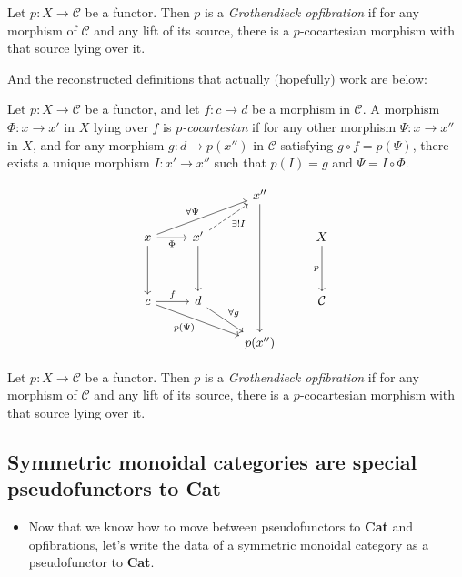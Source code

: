 \documentclass{MetricNotes2023}
\begin{document}
\begin{definition}
Let \(p : X \to \mathcal{C}\) be a functor. Then \(p\) is a \textit{Grothendieck opfibration} if for any morphism of \(\mathcal{C}\) and any lift of its source, there is a \(p\)-cocartesian morphism with that source lying over it.
\end{definition}

And the reconstructed definitions that actually (hopefully) work are below:

\begin{definition}
Let \(p : X \to \mathcal{C}\) be a functor, and let \(f : c \to d\) be a morphism in \(\mathcal{C}\). A morphism \(\Phi : x \to x'\) in \(X\) lying over \(f\) is \textit{\(p\)-cocartesian} if for any other morphism \(\Psi : x \to x''\) in \(X\), and for any morphism \(g : d \to p(x'')\) in \(\mathcal{C}\) satisfying \(g \circ f = p(\Psi)\), there exists a unique morphism \(I : x' \to x''\) such that \(p(I)=g\) and \(\Psi = I \circ \Phi\).  
\end{definition}

\[\begin{tikzcd}
 & & x'' \arrow[dddd, ""] & \\
x \arrow[r, swap, "\Phi"] \arrow[dd, swap, ""] \arrow[urr, "\forall \Psi"] & x' \arrow[dd, swap, ""] \arrow[ur, dashrightarrow, swap, "\exists! I"] & & X \arrow[dd, swap, "p"] \\
& & & \\
c \arrow[r, "f"] \arrow[rrd, swap, "p(\Psi)"] & d \arrow[rd, "\forall g"]  & & \mathcal{C}\\
 & & p(x'') & 
\end{tikzcd}\]


\begin{definition}
Let \(p : X \to \mathcal{C}\) be a functor. Then \(p\) is a \textit{Grothendieck opfibration} if for any morphism of \(\mathcal{C}\) and any lift of its source, there is a \(p\)-cocartesian morphism with that source lying over it.
\end{definition}

\subsection{Symmetric monoidal categories are special pseudofunctors to \textbf{Cat}}

\begin{itemize}
\item Now that we know how to move between pseudofunctors to \textbf{Cat} and opfibrations, let's write the data of a symmetric monoidal category as a pseudofunctor to \textbf{Cat}.
\end{itemize}
\end{document}

